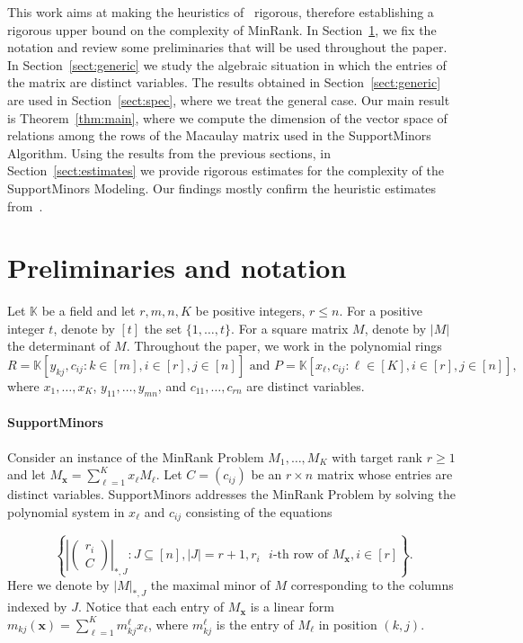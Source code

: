 \documentclass[utf8,latin1]{article}
\newcommand{\KK}{\mathbb{K}}
\newcommand{\abs}[1]{\ensuremath{\left\lvert #1 \right\rvert}}
\renewcommand{\vec}[1]{\ensuremath{ \mathbf #1 }}
\begin{document}
This work aims at making the heuristics of~\cite{BBCGPSTV20} rigorous, therefore establishing a rigorous upper bound on the complexity of MinRank. In Section~\ref{sect:prelim}, we fix the notation and review some preliminaries that will be used throughout the paper. In Section~\ref{sect:generic} we study the algebraic situation in which the entries of the matrix are distinct variables. The results obtained in Section~\ref{sect:generic} are used in Section~\ref{sect:spec}, where we treat the general case. Our main result is Theorem~\ref{thm:main}, where we compute the dimension of the vector space of relations among the rows of the Macaulay matrix used in the SupportMinors Algorithm. Using the results from the previous sections, in Section~\ref{sect:estimates} we provide rigorous estimates for the complexity of the SupportMinors Modeling. Our findings mostly confirm the heuristic estimates from~\cite{BBCGPSTV20}.

\section{Preliminaries and notation}\label{sect:prelim}

Let $\mathbb{K}$ be a field and let $r,m,n,K$ be positive integers, $r\leq n$. 
For a positive integer $t$, denote by $[t]$ the set $\{1,\ldots,t\}$.
For a square matrix $M$, denote by $|M|$ the determinant of $M$. 
Throughout the paper, we work in the polynomial rings $$R=\KK[y_{kj},c_{ij}: k\in[m], i\in[r], j\in[n]] \mbox{ and } P=\KK[x_{\ell},c_{ij}: \ell\in[K], i\in[r], j\in[n]],$$ where $x_1,\ldots,x_K$, $y_{11},\ldots,y_{mn}$, and $c_{11},\ldots,c_{rn}$ are distinct variables.

\paragraph{SupportMinors}
Consider an instance of the MinRank Problem $M_1,\ldots,M_K$ with target rank $r\geq 1$ and
let $M_\vec{x}=\sum_{\ell=1}^K x_\ell M_\ell$. Let $C=(c_{ij})$ be an $r\times n$ matrix whose entries are distinct variables. SupportMinors addresses the MinRank Problem by solving the polynomial system in $x_\ell$ and $c_{ij}$ consisting of the equations

\begin{equation}\label{eqn:sm}
\left\{
\left|\begin{pmatrix}
	r_i \\
	C
\end{pmatrix}\right|_{*,J}:
J\subseteq [n], \abs{J} = r+1, r_i \text{ $i$-th row of } M_\vec{x}, i\in[r]
\right\}.
\end{equation}
Here we denote by $|M|_{*,J}$ the maximal minor of $M$ corresponding to the columns indexed by $J$. 
Notice that each entry of $M_\vec{x}$ is a linear form $m_{kj}(\vec{x}) = \sum_{\ell=1}^K m^\ell_{k j}x_\ell$, where $m^\ell_{k j}$ is the entry of $M_\ell$ in position $(k,j)$.
\end{document}
